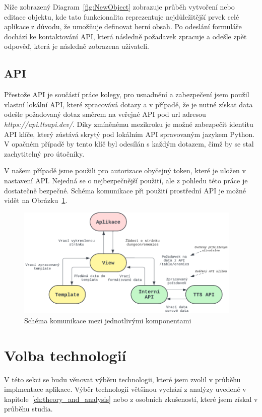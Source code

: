 Níže zobrazený Diagram~\ref{fig:NewObject} zobrazuje průběh vytvoření nebo editace objektu, kde tato funkcionalita reprezentuje nejdůležitější prvek celé aplikace z důvodu, že umožňuje definovat herní obsah. Po odeslání formuláře dochází ke kontaktování API, která následně požadavek zpracuje a odešle zpět odpověď, která je následně zobrazena uživateli.


\subsection{API}
\label{subsec:implementation-api}
Přestože API je součástí práce kolegy, pro usnadnění a zabezpečení jsem použil vlastní lokální API, které zpracovává dotazy a v případě, že je nutné získat data odešle požadovaný dotaz směrem na veřejné API pod url adresou \textit{https://api.ttsapi.dev/}. Díky zmíněnému mezikroku je možné zabezpečit identitu API klíče, který zůstává skrytý pod lokálním API spravovaným jazykem Python. V opačném případě by tento klíč byl odesílán s každým dotazem, čímž by se stal zachytitelný pro útočníky.

V našem případě jsme použili pro autorizace obyčejný token, které je uložen v nastavení API. Nejedná se o nejbezpečnější použití, ale z pohledu této práce je dostatečně bezpečné. Schéma komunikace při použití prostřední API je možné vidět na Obrázku~\ref{fig:api_communication}.

\begin{figure}[H]
    \centering
    \includegraphics[width=0.96\textwidth]{diagrams/API_Communication}
    \caption{Schéma komunikace mezi jednotlivými komponentami}
    \label{fig:api_communication}
\end{figure}

\section{Volba technologií}
\label{sec:implementation-technologies}
V této sekci se budu věnovat výběru technologii, které jsem zvolil v průběhu implmentace aplikace. Výběr technologii většinou vychází z analýzy uvedené v kapitole~\ref{ch:theory_and_analysis} nebo z osobních zkušeností, které jsem získal v průběhu studia.

